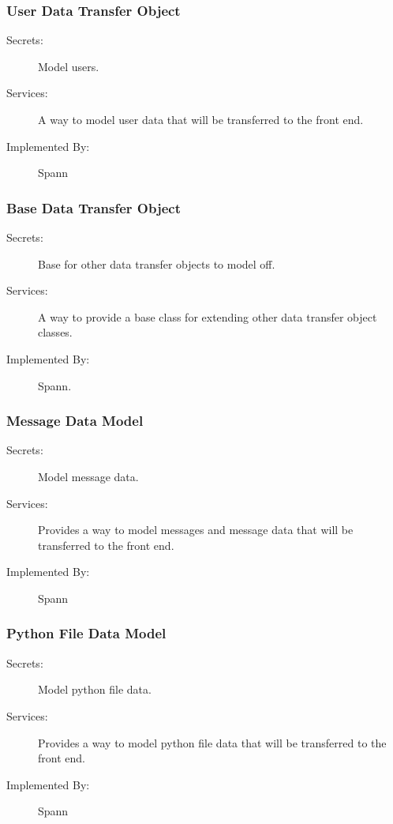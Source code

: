 \documentclass[12pt, titlepage]{article}
\begin{document}
\subsubsection{User Data Transfer Object}

\begin{description}
\item[Secrets:] Model users.
\item[Services:] A way to model user data that will be transferred to the front
    end.
\item[Implemented By:] Spann
\end{description}

\subsubsection{Base Data Transfer Object}

\begin{description}
\item[Secrets:] Base for other data transfer objects to model off.
\item[Services:] A way to provide a base class for extending other data
    transfer object classes.
\item[Implemented By:] Spann.
\end{description}

\subsubsection{Message Data Model}

\begin{description}
\item[Secrets:] Model message data.
\item[Services:] Provides a way to model messages and message data that will be
    transferred to the front end.
\item[Implemented By:] Spann
\end{description}

\subsubsection{Python File Data Model}

\begin{description}
\item[Secrets:] Model python file data.
\item[Services:] Provides a way to model python file data that will be transferred to the front end.
\item[Implemented By:] Spann
\end{description}
\end{document}

